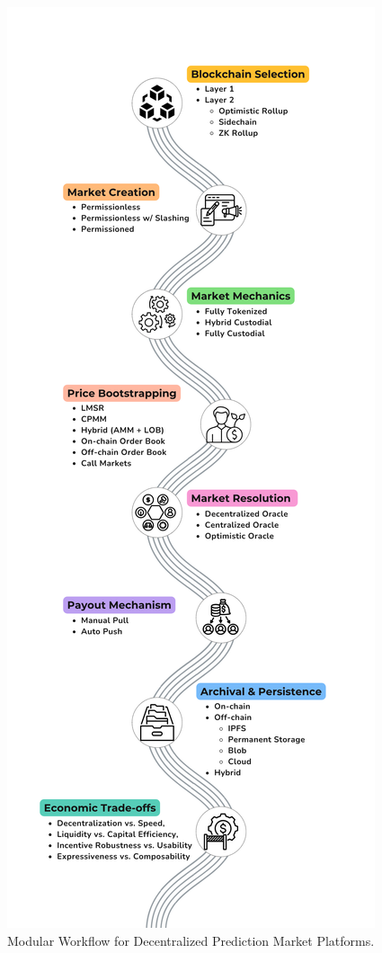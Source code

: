 {\begin{figure}
    \includegraphics[height=0.75\textheight]{figures/fig_modular_workflow.png}
   \caption{Modular Workflow for Decentralized Prediction Market Platforms.}
    \label{fig:dpm_workflow}
\end{figure}

}
